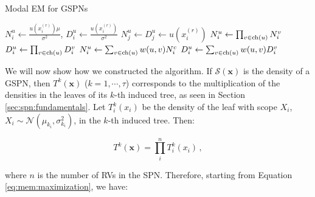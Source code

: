\begin{algorithm}[h]
  \caption{Modal EM for GSPNs}
  \label{alg:mem}
  \begin{algorithmic}
  \end{algorithmic}
  \begin{algorithmic}[1]
    \State $N^u_i \gets \frac{u\left(x^{(r)}_i\right)\mu}{\sigma^2}$,  $D^u_i \gets \frac{u\left(x^{(r)}_i\right)}{\sigma^2}$ \label{alg:mem:leaf:1}
    \State $N^u_j \gets D^u_j \gets u\left(x^{(r)}_i\right)$ \label{alg:mem:leaf:2}
    \EndFor
     \label{alg:mem:product}
    \State $N^u_i \gets \prod_{v \in \operatorname*{ch}(u)} N^v_i$
    \State $D^u_i \gets \prod_{v \in \operatorname*{ch}(u)} D^v_i$
    \EndFor
     \label{alg:mem:sum}
    \State $N^u_i \gets \sum_{v \in \operatorname*{ch}(u)} w(u, v) N^c_i$
    \State $D^u_i \gets \sum_{v \in \operatorname*{ch}(u)} w(u, v) D^v_i$
    \EndFor
    \EndIf
    \EndFor
    \State {} \label{alg:mem:return}
  \end{algorithmic}
\end{algorithm}

We will now show how we constructed the algorithm.
If $\mathcal{S}(\mathbf{x})$ is the density of a GSPN, then $T^k(\mathbf{x})$ ($k = 1, \cdots, \tau$) corresponds to the multiplication of the densities in the leaves of its $k$-th induced tree, as seen in Section \ref{sec:spn:fundamentals}. Let $T^k_i\left(x_i\right)$ be the density of the leaf with scope $X_i$, $X_i \sim \mathcal{N}\left(\mu_{k_i}, \sigma^2_{k_i}\right)$, in the $k$-th induced tree. Then:

\begin{equation}
  T^k(\mathbf{x}) = \prod_i^n T^k_i\left(x_i\right) \, ,
\end{equation}

\noindent where $n$ is the number of RVs in the SPN. Therefore, starting from Equation \ref{eq:mem:maximization}, we have:

